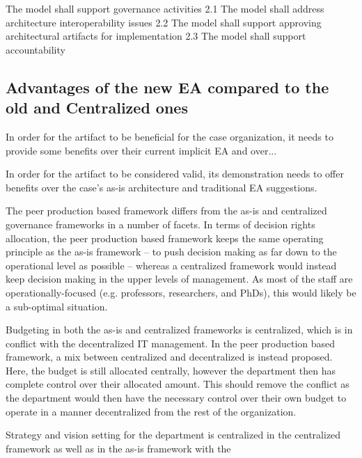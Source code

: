 The model shall support governance activities
2.1 The model shall address architecture interoperability issues
2.2 The model shall support approving architectural artifacts for implementation
2.3 The model shall support accountability


\subsection{Advantages of the new EA compared to the old and Centralized ones}

In order for the artifact to be beneficial for the case organization, it needs to provide some benefits over their current implicit EA and over... 

In order for the artifact to be considered valid, its demonstration needs to offer benefits over the case's as-is architecture and traditional EA suggestions. 


The peer production based framework differs from the as-is and centralized governance frameworks in a number of facets. In terms of decision rights allocation, the peer production based framework keeps the same operating principle as the as-is framework -- to push decision making as far down to the operational level as possible -- whereas a centralized framework would instead keep decision making in the upper levels of management. As most of the staff are operationally-focused (e.g. professors, researchers, and PhDs), this would likely be a sub-optimal situation. 

Budgeting in both the as-is and centralized frameworks is centralized, which is in conflict with the decentralized IT management. In the peer production based framework, a mix between  centralized and decentralized is instead proposed. Here, the budget is still allocated centrally, however the department then has complete control over their allocated amount. This should remove the conflict as the department would then have the necessary control over their own budget to operate in a manner decentralized from the rest of the organization. 

Strategy and vision setting for the department is centralized in the centralized framework as well as in the as-is framework with the 



